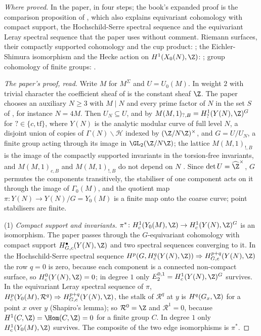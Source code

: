 \begin{sloppypar}
\noindent\emph{Where proved.} In the paper, in four steps; the book's expanded proof is the comparison proposition of , which
also explains equivariant cohomology with compact support, the Hochschild-Serre spectral sequence and the equivariant Leray spectral sequence that the paper uses
without comment. Riemann surfaces, their compactly supported cohomology and the cup product: ; the Eichler-Shimura isomorphism and the Hecke
action on $H^1(X_0(N),\Z)$: ; group cohomology of finite groups: .

\begin{proof}[The paper's proof, read]
Write $M$ for $M^\Sigma$ and $U=U_0(M)$. In weight $2$ with trivial character the coefficient sheaf of \cite[Section 1.2.2]{DFG04} is the constant sheaf $\Z$. The paper
chooses an auxiliary $N\ge3$ with $M\mid N$ and every prime factor of $N$ in the set $S$ of \cite[Section 1.4.1]{DFG04}, for instance $N=4M$. Then $U_N\subseteq U$, and by
\cite[Section 1.4.1]{DFG04} $M(M,1)_{?,B}=H^1_?(Y(N),\Z)^G$ for $?\in\{c,\mathrm{tf}\}$, where $Y(N)$ is the analytic modular curve of full level $N$, a disjoint union of copies of
$\Gamma(N)\backslash\mathcal H$ indexed by $(\Z/N\Z)^\times$, and $G=U/U_N$, a finite group acting through its image in $\GL_2(\Z/N\Z)$; the lattice $M(M,1)_{!,B}$ is the image of the
compactly supported invariants in the torsion-free invariants, and $M(M,1)_{c,B}$ and $M(M,1)_{!,B}$ do not depend on $N$ \cite[Section 1.4.1, Lemma 1.1]{DFG04}. Since $\det U=\widehat\Z^\times$, $G$ permutes the
components transitively, the stabiliser of one component acts on it through the image of $\Gamma_0(M)$, and the quotient map $\pi\colon Y(N)\to Y(N)/G=Y_0(M)$ is a finite map
onto the coarse curve; point stabilisers are finite.

(1) \emph{Compact support and invariants.} $\pi^*\colon H^1_c(Y_0(M),\Z)\to H^1_c(Y(N),\Z)^G$ is an isomorphism. The paper passes through the $G$-equivariant cohomology with
compact support $H^\bullet_{G,c}(Y(N),\Z)$ and two spectral sequences converging to it. In the Hochschild-Serre spectral sequence
$H^p(G,H^q_c(Y(N),\Z))\Rightarrow H^{p+q}_{G,c}(Y(N),\Z)$ the row $q=0$ is zero, because each component is a connected non-compact surface, so $H^0_c(Y(N),\Z)=0$; in degree $1$
only $E_2^{0,1}=H^1_c(Y(N),\Z)^G$ survives. In the equivariant Leray spectral sequence of $\pi$, $H^p_c(Y_0(M),\mathcal R^q)\Rightarrow H^{p+q}_{G,c}(Y(N),\Z)$, the stalk of $\mathcal R^q$ at $y$ is
$H^q(G_x,\Z)$ for a point $x$ over $y$ (Shapiro's lemma); so $\mathcal R^0=\Z$ and $\mathcal R^1=0$, because $H^1(C,\Z)=\Hom(C,\Z)=0$ for a finite group $C$. In degree $1$ only
$H^1_c(Y_0(M),\Z)$ survives. The composite of the two edge isomorphisms is $\pi^*$.


\end{proof}
\end{sloppypar}
